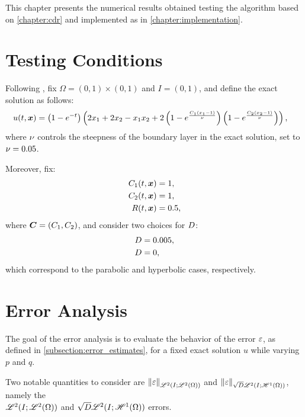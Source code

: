 This chapter presents the numerical results obtained testing the algorithm based on \cref{chapter:cdr} and implemented as in \cref{chapter:implementation}.

\section{Testing Conditions}

Following \cite{Feistauer2007}, fix $\Omega = \left( 0, 1 \right) \times \left( 0, 1 \right)$ and $I = \left( 0, 1 \right)$, and define the exact solution as follows:
\begin{align}
    u(t, \bm{x}) &= \left( 1 - e^{-t} \right) \left( 2 x_1 + 2 x_2 - x_1 x_2 + 2 \left( 1 - e^{\frac{C_1 \left( x_1 - 1 \right) }{\nu}} \right) \left( 1 - e^{\frac{C_2 \left( x_2 - 1 \right) }{\nu}} \right) \right),
\end{align}
where $\nu$ controls the steepness of the boundary layer in the exact solution, set to $\nu = 0.05$.

Moreover, fix:
\begin{align}
    C_1(t, \bm{x}) &= 1, \\
    C_2(t, \bm{x}) &= 1, \\
    R(t, \bm{x}) &= 0.5,
\end{align}
where $\bm{C} = \left( C_1, C_2 \right)$, and consider two choices for $D$:
\begin{align}
    D &= 0.005, \\
    D &= 0,
\end{align}
which correspond to the parabolic and hyperbolic cases, respectively.

\newpage
\section{Error Analysis} \label{section:error_results}

The goal of the error analysis is to evaluate the behavior of the error $\varepsilon$, as defined in \cref{subsection:error_estimates}, for a fixed exact solution $u$ while varying $p$ and $q$.

Two notable quantities to consider are $\left\lVert \varepsilon \right\rVert_{\mathscr{L}^{2}(I; \mathscr{L}^{2}(\Omega))}$ and $\left\lVert \varepsilon \right\rVert_{\sqrt{D} \mathscr{L}^{2}(I; \mathscr{H}^{1}(\Omega))}$, namely the \\ $\mathscr{L}^{2}(I; \mathscr{L}^{2}(\Omega))$ and $\sqrt{D} \mathscr{L}^{2}(I; \mathscr{H}^{1}(\Omega))$ errors.

